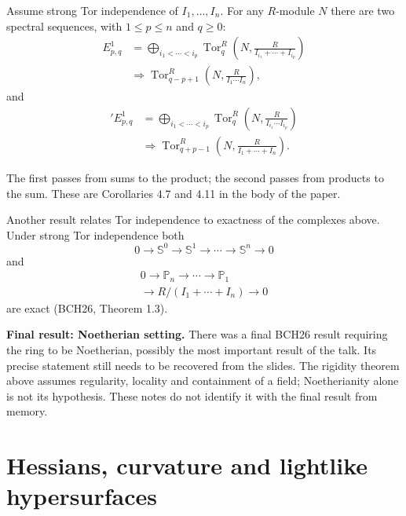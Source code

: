\begin{proposition}
\label{proposition-rafael-spectral}
Assume strong Tor independence of
$I_1,\ldots,I_n$. For any $R$-module $N$
there are two spectral sequences, with
$1\leq p\leq n$ and $q\geq0$:
$$
\begin{aligned}
E^1_{p,q}
&=\bigoplus_{i_1<\cdots<i_p}
\operatorname{Tor}_q^R\!\left(
N,\frac{R}{I_{i_1}+\cdots+I_{i_p}}
\right)\\
&\Longrightarrow
\operatorname{Tor}_{q-p+1}^R\!\left(
N,\frac{R}{I_1\cdots I_n}\right),
\end{aligned}
$$
and
$$
\begin{aligned}
{}'E^1_{p,q}
&=\bigoplus_{i_1<\cdots<i_p}
\operatorname{Tor}_q^R\!\left(
N,\frac{R}{I_{i_1}\cdots I_{i_p}}
\right)\\
&\Longrightarrow
\operatorname{Tor}_{q+p-1}^R\!\left(
N,\frac{R}{I_1+\cdots+I_n}\right).
\end{aligned}
$$
\end{proposition}

The first passes from sums to the product;
the second passes from products to the sum.
These are Corollaries 4.7 and 4.11 in
the body of the paper.

Another result relates Tor independence
to exactness of the complexes above.
Under strong Tor independence both
$$
0\longrightarrow\mathbb{S}^0
\longrightarrow\mathbb{S}^1
\longrightarrow\cdots
\longrightarrow\mathbb{S}^n
\longrightarrow0
$$
and
$$
\begin{gathered}
0\longrightarrow\mathbb{P}_n
\longrightarrow\cdots
\longrightarrow\mathbb{P}_1\\
\longrightarrow R/(I_1+\cdots+I_n)
\longrightarrow0
\end{gathered}
$$
are exact (BCH26, Theorem 1.3).

\medskip\noindent
\textbf{Final result: Noetherian setting.}
There was a final BCH26 result
requiring the ring to be Noetherian,
possibly the most important result
of the talk. Its precise statement
still needs to be recovered from the
slides.
The rigidity theorem above assumes
regularity, locality and containment of
a field; Noetherianity alone is not its
hypothesis. These notes do not identify
it with the final result from memory.

\section{Hessians, curvature and lightlike
hypersurfaces}
\label{section-thiago-silva}

